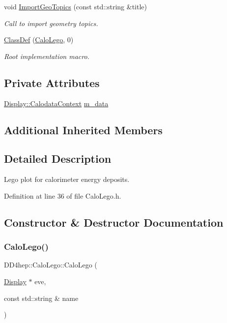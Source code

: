 \begin{DoxyCompactItemize}
void \hyperlink{class_d_d4hep_1_1_calo_lego_a0d62d7d45cb1935651cbc9fc2d37af57}{Import\+Geo\+Topics} (const std\+::string \&title)
\begin{DoxyCompactList}\small\item\em Call to import geometry topics. \end{DoxyCompactList}\item 
\hyperlink{class_d_d4hep_1_1_calo_lego_a1a4c9c092acfa08adb65b7fe594fa7fd}{Class\+Def} (\hyperlink{class_d_d4hep_1_1_calo_lego}{Calo\+Lego}, 0)
\begin{DoxyCompactList}\small\item\em Root implementation macro. \end{DoxyCompactList}\end{DoxyCompactItemize}
\subsection*{Private Attributes}
\begin{DoxyCompactItemize}
\item 
\hyperlink{struct_d_d4hep_1_1_display_1_1_calodata_context}{Display\+::\+Calodata\+Context} \hyperlink{class_d_d4hep_1_1_calo_lego_a2d5755595411d469277f8e9c823eb510}{m\+\_\+data}
\end{DoxyCompactItemize}
\subsection*{Additional Inherited Members}


\subsection{Detailed Description}
Lego plot for calorimeter energy deposits. 

Definition at line 36 of file Calo\+Lego.\+h.



\subsection{Constructor \& Destructor Documentation}
\hypertarget{class_d_d4hep_1_1_calo_lego_abeda4832cbd7103bbd3b1d4bfe2fe1dc}{}\label{class_d_d4hep_1_1_calo_lego_abeda4832cbd7103bbd3b1d4bfe2fe1dc} 
\subsubsection{\texorpdfstring{Calo\+Lego()}{CaloLego()}}
{\footnotesize\ttfamily D\+D4hep\+::\+Calo\+Lego\+::\+Calo\+Lego (\begin{DoxyParamCaption}\item[{\hyperlink{class_d_d4hep_1_1_display}{Display} $\ast$}]{eve,  }\item[{const std\+::string \&}]{name }\end{DoxyParamCaption})}



